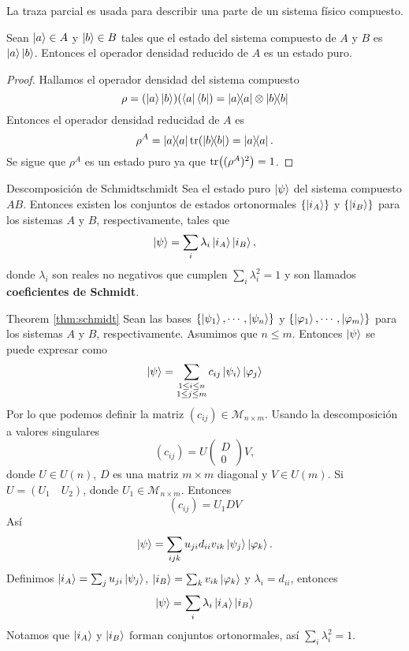 \begin{Note}
	La traza parcial es usada para describir una parte de un sistema físico compuesto.
\end{Note}
\begin{proposition}
	Sean $\ket{a}\in A$ y $\ket{b}\in B$ tales que el estado del sistema compuesto de $A$ y $B$ es $\ket{a}\ket{b}$. Entonces el operador densidad reducido de $A$ es un estado puro.
\end{proposition}
\begin{proof}
	Hallamos el operador densidad del sistema compuesto \[\rho=(\ket{a}\ket{b})(\bra{a}\bra{b})=\ketbra{a}\otimes\ketbra{b}\]
	Entonces el operador densidad reducidad de $A$ es \[\rho^A=\ketbra{a}\tr(\ketbra{b})=\ketbra{a}.\]
	Se sigue que $\rho^A$ es un estado puro ya que $\tr((\rho^A)^2)=1$.
\end{proof}
\begin{Theorem}{Descomposición de Schmidt}{schmidt}
	Sea el estado puro $\ket{\psi}$ del sistema compuesto $AB$. Entonces existen los conjuntos de estados ortonormales $\{\ket{i_A}\}$ y $\{\ket{i_B}\}$ para los sistemas $A$ y $B$, respectivamente, tales que \[\ket{\psi}=\sum_i\lambda_i\ket{i_A}\ket{i_B},\]
	donde $\lambda_i$ son reales no negativos que cumplen $\sum_i\lambda_i^2=1$ y son llamados \textbf{coeficientes de Schmidt}.
\end{Theorem}
\begin{Proof}{Theorem \ref{thm:schmidt}}{}
	Sean las bases $\{\ket{\psi_1},\cdots,\ket{\psi_n}\}$ y $\{\ket{\varphi_1},\cdots,\ket{\varphi_m}\}$ para los sistemas $A$ y $B$, respectivamente. Asumimos que $n\leq m$. Entonces $\ket{\psi}$ se puede expresar como
	\[\ket{\psi}=\sum_{\substack{1\leq i\leq n\\1\leq j\leq m}}c_{ij}\ket{\psi_i}\ket{\varphi_j}\]
	Por lo que podemos definir la matriz $(c_{ij})\in\mathcal{M}_{n\times m}$. Usando la descomposición a valores singulares\[(c_{ij})=U\begin{pmatrix}
			D \\
			0
		\end{pmatrix}V,\]donde $U\in U(n)$, $D$ es una matriz $m\times m$ diagonal y $V\in U(m)$. Si $U=(U_1\quad U_2)$, donde $U_1\in \mathcal{M}_{n\times m}$. Entonces\[(c_{ij})=U_1 D V\]
	Así \[\ket{\psi}=\sum_{ijk}u_{ji}d_{ii}v_{ik}\ket{\psi_j}\ket{\varphi_k}.\]
	Definimos $\ket{i_A}=\sum_ju_{ji}\ket{\psi_j}$, $\ket{i_B}=\sum_{k}v_{ik}\ket{\varphi_k}$ y $\lambda_i=d_{ii}$, entonces
	\[\ket{\psi}=\sum_i\lambda_i\ket{i_A}\ket{i_B}\]
	Notamos que $\ket{i_A}$ y $\ket{i_B}$ forman conjuntos ortonormales, así $\sum_i\lambda_i^2=1$.
\end{Proof}

